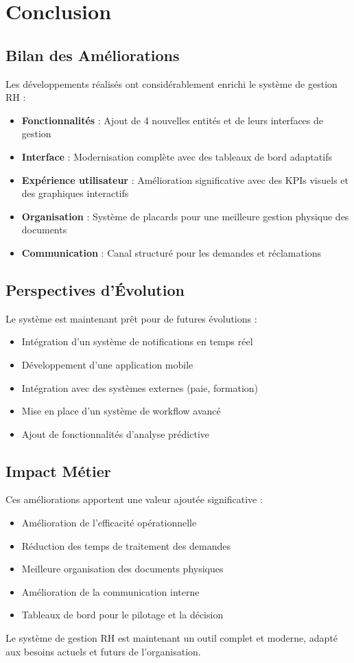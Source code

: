 \documentclass[12pt,a4paper]{article}
\begin{document}
\section{Conclusion}

\subsection{Bilan des Améliorations}
Les développements réalisés ont considérablement enrichi le système de gestion RH :

\begin{itemize}
    \item \textbf{Fonctionnalités} : Ajout de 4 nouvelles entités et de leurs interfaces de gestion
    \item \textbf{Interface} : Modernisation complète avec des tableaux de bord adaptatifs
    \item \textbf{Expérience utilisateur} : Amélioration significative avec des KPIs visuels et des graphiques interactifs
    \item \textbf{Organisation} : Système de placards pour une meilleure gestion physique des documents
    \item \textbf{Communication} : Canal structuré pour les demandes et réclamations
\end{itemize}

\subsection{Perspectives d'Évolution}
Le système est maintenant prêt pour de futures évolutions :
\begin{itemize}
    \item Intégration d'un système de notifications en temps réel
    \item Développement d'une application mobile
    \item Intégration avec des systèmes externes (paie, formation)
    \item Mise en place d'un système de workflow avancé
    \item Ajout de fonctionnalités d'analyse prédictive
\end{itemize}

\subsection{Impact Métier}
Ces améliorations apportent une valeur ajoutée significative :
\begin{itemize}
    \item Amélioration de l'efficacité opérationnelle
    \item Réduction des temps de traitement des demandes
    \item Meilleure organisation des documents physiques
    \item Amélioration de la communication interne
    \item Tableaux de bord pour le pilotage et la décision
\end{itemize}

Le système de gestion RH est maintenant un outil complet et moderne, adapté aux besoins actuels et futurs de l'organisation.
\end{document}
